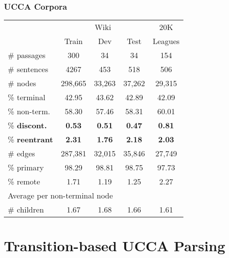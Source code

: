 \documentclass[t]{beamer}
\begin{document}
\begin{frame}
\frametitle{UCCA Corpora}
\centering
\begin{tabular}{l|ccc|c}
& \multicolumn{3}{c|}{Wiki} & 20K \\
& \small Train & \small Dev & \small Test & Leagues \\
\hline
\# passages & 300 & 34 & 34 & 154 \\
\# sentences & 4267 & 453 & 518 & 506 \\
\hline
\# nodes & 298,665 & 33,263 & 37,262 & 29,315 \\
\% terminal & 42.95 & 43.62 & 42.89 & 42.09 \\
\% non-term. & 58.30 & 57.46 & 58.31 & 60.01 \\
\% \bf discont. & \bf 0.53 & \bf 0.51 & \bf 0.47 & \bf 0.81 \\
\% \bf reentrant & \bf 2.31 & \bf 1.76 & \bf 2.18 & \bf 2.03 \\
\hline
\# edges & 287,381 & 32,015 & 35,846 & 27,749 \\
\% primary & 98.29 & 98.81 & 98.75 & 97.73 \\
\% remote & 1.71 & 1.19 & 1.25 & 2.27 \\
\hline
\multicolumn{3}{l}{\footnotesize Average per non-terminal node} \\
\# children & 1.67 & 1.68 & 1.66 & 1.61 
\end{tabular}
\end{frame}



\section{Transition-based UCCA Parsing}
\end{document}
